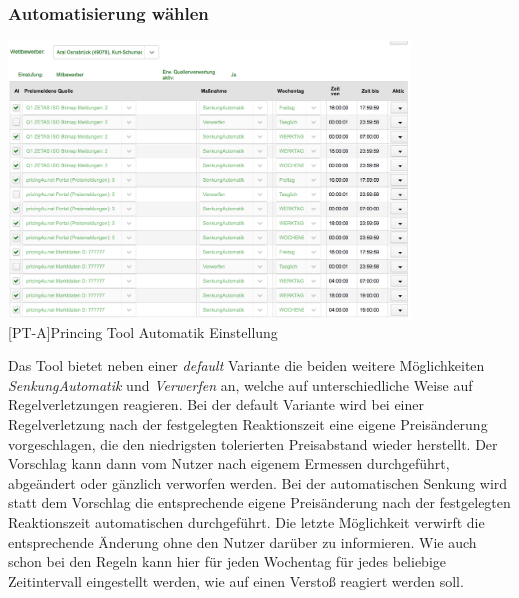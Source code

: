 \documentclass[12pt,a4paper,bibliography=totocnumbered,listof=totocnumbered]{scrartcl}
\begin{document}
\subsubsection{Automatisierung wählen}
\begin{center}
	\includegraphics[width=0.8\textwidth]{Bilder/automatik.png}\\
	[PT-A]{Princing Tool Automatik Einstellung}
	\label{fig:PT-A}
\end{center}                                                                          
Das Tool bietet neben einer \textit{default} Variante die beiden weitere Möglichkeiten \textit{SenkungAutomatik} und \textit{Verwerfen} an, welche auf unterschiedliche Weise auf Regelverletzungen reagieren. Bei der default Variante wird bei einer Regelverletzung nach der festgelegten Reaktionszeit eine eigene Preisänderung vorgeschlagen, die den niedrigsten tolerierten Preisabstand wieder herstellt. Der Vorschlag kann dann vom Nutzer nach eigenem Ermessen durchgeführt, abgeändert oder gänzlich verworfen werden. Bei der automatischen Senkung wird statt dem Vorschlag die entsprechende eigene Preisänderung nach der festgelegten Reaktionszeit automatischen durchgeführt. Die letzte Möglichkeit verwirft die entsprechende Änderung ohne den Nutzer darüber zu informieren.  Wie auch schon bei den Regeln kann hier für jeden Wochentag für jedes beliebige Zeitintervall eingestellt werden, wie auf einen Verstoß reagiert werden soll.

\pagebreak


\end{document}
